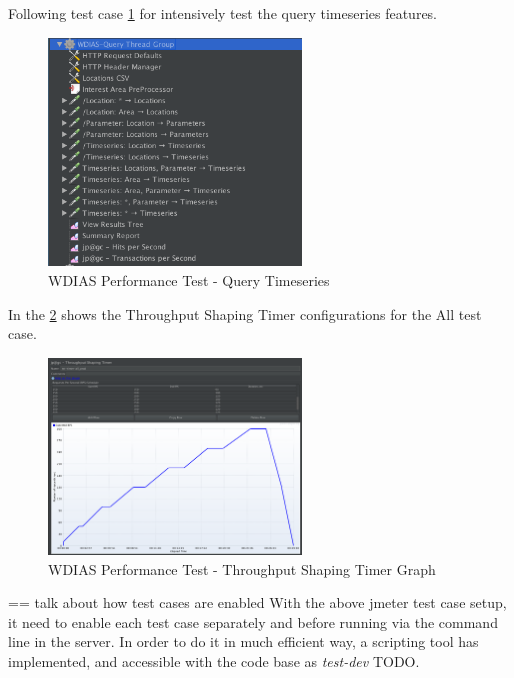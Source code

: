Following test case \ref{fi:test_query_timeseries} for intensively test the query timeseries features.

\begin{figure}[htp]
    \centering
    \includegraphics[width=0.6\textwidth]{results/work_load/test_query_timeseries.png}
    \caption{WDIAS Performance Test - Query Timeseries}
    \label{fi:test_query_timeseries}
\end{figure}

In the \ref{fi:test_prod_throughtput_shaping_timer} shows the Throughput Shaping Timer configurations for the All test case.

\begin{figure}[htp]
    \centering
    \includegraphics[width=0.6\textwidth]{results/work_load/test_prod_throughtput_shaping_timer.png}
    \caption{WDIAS Performance Test - Throughput Shaping Timer Graph}
    \label{fi:test_prod_throughtput_shaping_timer}
\end{figure}

== talk about how test cases are enabled
With the above \acrshort{jmeter} test case setup, it need to enable each test case separately and before running via the command line in the server. In order to do it in much efficient way, a scripting tool has implemented, and accessible with the code base \cite{Haggett1998AnWales} as \emph{test-dev} TODO.

